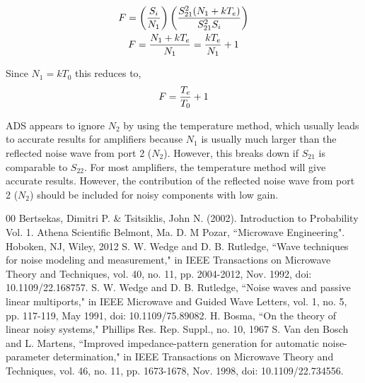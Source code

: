 \documentclass[journal]{IEEEtran}
\begin{document}
\begin{gather}
F = \left(\frac{S_i}{N_1}\right) \left({S_{21}^2( N_1 + kT_e) \over S_{21}^2 S_i}\right) \notag \\
F =  { N_1 + kT_e \over N_1} = {kT_e \over N_1} + 1\notag
\end{gather}

Since \(N_1 = kT_0\) this reduces to,
\[F = {T_e \over T_0} + 1\]

ADS appears to ignore \(N_2\) by using the temperature method, which usually leads to accurate results for amplifiers because \(N_1\) is usually much larger than the reflected noise wave from port 2 (\(N_2\)). However, this breaks down if \(S_{21}\) is comparable to \(S_{22}\). For most amplifiers, the temperature method will give accurate results. However, the contribution of the reflected noise wave from port 2 (\(N_2\)) should be included for noisy components with low gain.

\vfill

\pagebreak

\vfill

\pagebreak

\begin{thebibliography}{00}
 Bertsekas, Dimitri P. \& Tsitsiklis, John N. (2002). Introduction to Probability Vol. 1. Athena Scientific Belmont, Ma.
 D. M Pozar, ``Microwave Engineering". Hoboken, NJ, Wiley, 2012
 S. W. Wedge and D. B. Rutledge, ``Wave techniques for noise modeling and measurement," in IEEE Transactions on Microwave Theory and Techniques, vol. 40, no. 11, pp. 2004-2012, Nov. 1992, doi: 10.1109/22.168757.
 S. W. Wedge and D. B. Rutledge, ``Noise waves and passive linear multiports," in IEEE Microwave and Guided Wave Letters, vol. 1, no. 5, pp. 117-119, May 1991, doi: 10.1109/75.89082.
 H. Bosma, ``On the theory of linear noisy systems," Phillips Res. Rep. Suppl., no. 10, 1967
 S. Van den Bosch and L. Martens, ``Improved impedance-pattern generation for automatic noise-parameter determination," in IEEE Transactions on Microwave Theory and Techniques, vol. 46, no. 11, pp. 1673-1678, Nov. 1998, doi: 10.1109/22.734556.
\end{thebibliography}
\end{document}
